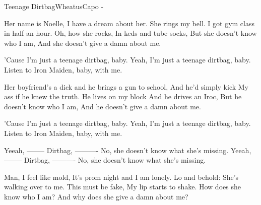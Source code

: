 \begin{song}{Teenage Dirtbag}{Wheatus}{Capo - }

 

Her name is Noelle,
I have a dream about her. She rings my bell.
I got gym class in half an hour. Oh, how she rocks,
In keds and tube socks, But she doesn't know who I am,
And she doesn't give a damn about me.

'Cause I'm just a teenage dirtbag, baby.
Yeah, I'm just a teenage dirtbag, baby.
Listen to Iron Maiden, baby, with me.


Her boyfriend's a dick
and he brings a gun to school, And he'd simply kick
My ass if he knew the truth. He lives on my block
And he drives an Iroc, But he doesn't know who I am,
And he doesn't give a damn about me.

'Cause I'm just a teenage dirtbag, baby.
Yeah, I'm just a teenage dirtbag, baby.
Listen to Iron Maiden, baby, with me.

Yeeah, -------- Dirtbag, ----------
No, she doesn't know what she's missing.
Yeeah, -------- Dirtbag, ----------
No, she doesn't know what she's missing.


Man, I feel like mold,
It's prom night and I am lonely. Lo and behold:
She's walking over to me. This must be fake,
My lip starts to shake. How does she know who I am?
And why does she give a damn about me?


\end{song}
